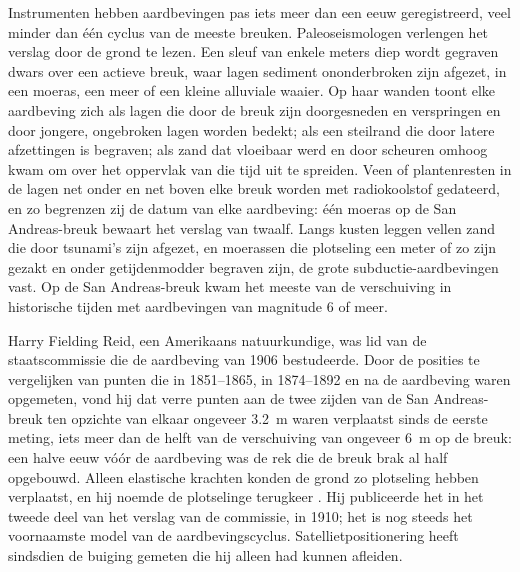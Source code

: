 \begin{inthefield}
Instrumenten hebben aardbevingen pas iets meer dan een eeuw geregistreerd, veel minder dan één cyclus van de meeste breuken. Paleoseismologen verlengen het verslag door de grond te lezen. Een sleuf van enkele meters diep wordt gegraven dwars over een actieve breuk, waar lagen sediment ononderbroken zijn afgezet, in een moeras, een meer of een kleine alluviale waaier. Op haar wanden toont elke aardbeving zich als lagen die door de breuk zijn doorgesneden en verspringen en door jongere, ongebroken lagen worden bedekt; als een steilrand die door latere afzettingen is begraven; als zand dat vloeibaar werd en door scheuren omhoog kwam om over het oppervlak van die tijd uit te spreiden. Veen of plantenresten in de lagen net onder en net boven elke breuk worden met radiokoolstof gedateerd, en zo begrenzen zij de datum van elke aardbeving: één moeras op de San Andreas-breuk bewaart het verslag van twaalf. Langs kusten leggen vellen zand die door tsunami's zijn afgezet, en moerassen die plotseling een meter of zo zijn gezakt en onder getijdenmodder begraven zijn, de grote subductie-aardbevingen vast. Op de San Andreas-breuk kwam het meeste van de verschuiving in historische tijden met aardbevingen van magnitude 6 of meer.
\end{inthefield}

\begin{history}
Harry Fielding Reid, een Amerikaans natuurkundige, was lid van de staatscommissie die de aardbeving van 1906 bestudeerde. Door de posities te vergelijken van punten die in 1851--1865, in 1874--1892 en na de aardbeving waren opgemeten, vond hij dat verre punten aan de twee zijden van de San Andreas-breuk ten opzichte van elkaar ongeveer \qty{3.2}{m} waren verplaatst sinds de eerste meting, iets meer dan de helft van de verschuiving van ongeveer \qty{6}{m} op de breuk: een halve eeuw vóór de aardbeving was de rek die de breuk brak al half opgebouwd. Alleen elastische krachten konden de grond zo plotseling hebben verplaatst, en hij noemde de plotselinge terugkeer . Hij publiceerde het in het tweede deel van het verslag van de commissie, in 1910; het is nog steeds het voornaamste model van de aardbevingscyclus. Satellietpositionering heeft sindsdien de buiging gemeten die hij alleen had kunnen afleiden.
\end{history}

